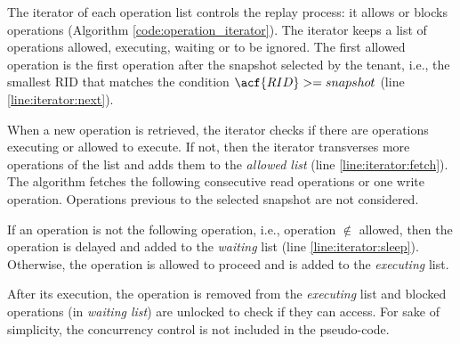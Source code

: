 The iterator of each operation list controls the replay process: it allows or blocks operations (Algorithm \ref{code:operation_iterator}). The iterator keeps a list of operations allowed, executing, waiting or to be ignored. The first allowed operation is the first operation after the snapshot selected by the tenant, i.e., the smallest \acf{RID} that matches the condition $\acf{RID} >= snapshot$ (line \ref{line:iterator:next}). 

When a new operation is retrieved, the iterator checks if there are operations executing or allowed to execute. If not, then the iterator transverses more operations of the list and adds them to the \emph{allowed list} (line \ref{line:iterator:fetch}). The algorithm fetches the following consecutive read operations or one write operation. Operations previous to the selected snapshot are not considered.

If an operation is not the following operation, i.e., operation $\notin$ allowed, then the operation is delayed and added to the \emph{waiting} list (line \ref{line:iterator:sleep}). Otherwise, the operation is allowed to proceed and is added to the \emph{executing} list.

After its execution, the operation is removed from the \emph{executing} list and blocked operations (in \emph{waiting list}) are unlocked to check if they can access. For sake of simplicity, the concurrency control is not included in the pseudo-code. \\


